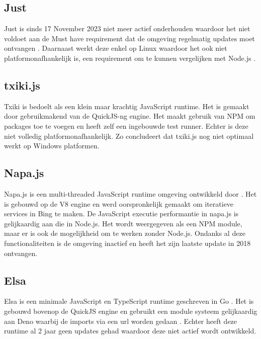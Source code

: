 \subsection{Just}
Just is sinds 17 November 2023 niet meer actief onderhouden waardoor het niet voldoet aan de Must 
have requirement dat de omgeving regelmatig updates moet ontvangen \autocite{Johnston2023}.
Daarnaast werkt deze enkel op Linux waardoor het ook niet platformonafhankelijk is, 
een requirement om te kunnen vergelijken met Node.js \autocite{Johnston2023}.

\subsection{txiki.js}
Txiki is bedoelt als een klein maar krachtig JavaScript runtime. 
Het is gemaakt door \textcite{Corretge2024} gebruikmakend van de QuickJS-ng engine. 
Het maakt gebruik van NPM om packages toe te voegen en heeft zelf een ingebouwde test runner. 
Echter is deze niet volledig platformonafhankelijk. 
Zo concludeert \textcite{Corretge2024} dat txiki.js nog niet optimaal werkt op Windows platformen.

\subsection{Napa.js}
Napa.js is een multi-threaded JavaScript runtime omgeving ontwikkeld door \textcite{Microsoft2018}. 
Het is gebouwd op de V8 engine en werd oorspronkelijk gemaakt om iteratieve services in Bing te maken.
De JavaScript executie performantie in napa.js is gelijkaardig aan die in Node.js. 
Het wordt weergegeven als een NPM module, maar er is ook de mogelijkheid om te werken zonder Node.js.
Ondanks al deze functionaliteiten is de omgeving inactief en heeft het zijn laatste update in 2018 ontvangen.

\subsection{Elsa}
Elsa is een minimale JavaScript en TypeScript runtime geschreven in Go \autocite{Garcia2022}. 
Het is gebouwd bovenop de QuickJS engine en gebruikt een module systeem gelijkaardig aan Deno waarbij de imports via een url worden gedaan \autocite{Garcia2022}.
Echter heeft deze runtime al 2 jaar geen updates gehad waardoor deze niet actief wordt ontwikkeld.